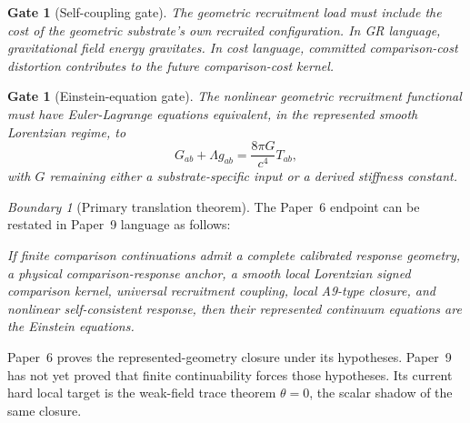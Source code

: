 \documentclass[11pt]{article}
\newtheorem{gate}[theorem]{Gate}
\theoremstyle{remark}
\newtheorem{warning}[theorem]{Boundary}
\begin{document}
\begin{gate}[Self-coupling gate]
The geometric recruitment load must include the cost of the geometric substrate's own recruited configuration.  In GR language, gravitational field energy gravitates.  In cost language, committed comparison-cost distortion contributes to the future comparison-cost kernel.
\end{gate}

\begin{gate}[Einstein-equation gate]
The nonlinear geometric recruitment functional must have Euler-Lagrange equations equivalent, in the represented smooth Lorentzian regime, to
\[
        G_{ab}+\Lambda g_{ab}=\frac{8\pi G}{c^4}T_{ab},
\]
with \(G\) remaining either a substrate-specific input or a derived stiffness constant.
\end{gate}

\begin{warning}[Primary translation theorem]
The Paper~6 endpoint can be restated in Paper~9 language as follows:

\emph{If finite comparison continuations admit a complete calibrated response geometry, a physical comparison-response anchor, a smooth local Lorentzian signed comparison kernel, universal recruitment coupling, local A9-type closure, and nonlinear self-consistent response, then their represented continuum equations are the Einstein equations.}

Paper~6 proves the represented-geometry closure under its hypotheses.  Paper~9 has not yet proved that finite continuability forces those hypotheses.  Its current hard local target is the weak-field trace theorem \(\theta=0\), the scalar shadow of the same closure.
\end{warning}
\end{document}
